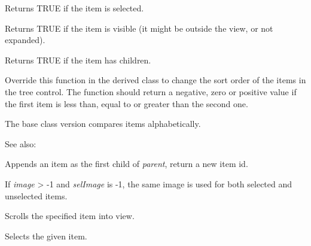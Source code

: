 Returns TRUE if the item is selected.

\label{wxtreectrlisvisible}


Returns TRUE if the item is visible (it might be outside the view, or not expanded).

\label{wxtreectrlitemhaschildren}


Returns TRUE if the item has children.

\label{wxtreectrloncompareitems}


Override this function in the derived class to change the sort order of the
items in the tree control. The function should return a negative, zero or
positive value if the first item is less than, equal to or greater than the
second one.

The base class version compares items alphabetically.

See also: 

\label{wxtreectrlprependitem}


Appends an item as the first child of {\it parent}, return a new item id.

If {\it image} > -1 and {\it selImage} is -1, the same image is used for
both selected and unselected items.

\label{wxtreectrlscrollto}


Scrolls the specified item into view.

\label{wxtreectrlselectitem}


Selects the given item.

